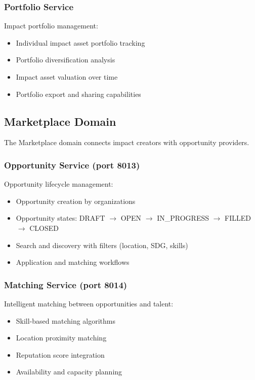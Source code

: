 \subsubsection{Portfolio Service}

Impact portfolio management:
\begin{itemize}
  \item Individual impact asset portfolio tracking
  \item Portfolio diversification analysis
  \item Impact asset valuation over time
  \item Portfolio export and sharing capabilities
\end{itemize}

\subsection{Marketplace Domain}

The Marketplace domain connects impact creators with opportunity providers.

\subsubsection{Opportunity Service (port 8013)}

Opportunity lifecycle management:
\begin{itemize}
  \item Opportunity creation by organizations
  \item Opportunity states: DRAFT $\rightarrow$ OPEN $\rightarrow$ IN\_PROGRESS $\rightarrow$ FILLED $\rightarrow$ CLOSED
  \item Search and discovery with filters (location, SDG, skills)
  \item Application and matching workflows
\end{itemize}

\subsubsection{Matching Service (port 8014)}

Intelligent matching between opportunities and talent:
\begin{itemize}
  \item Skill-based matching algorithms
  \item Location proximity matching
  \item Reputation score integration
  \item Availability and capacity planning
\end{itemize}

